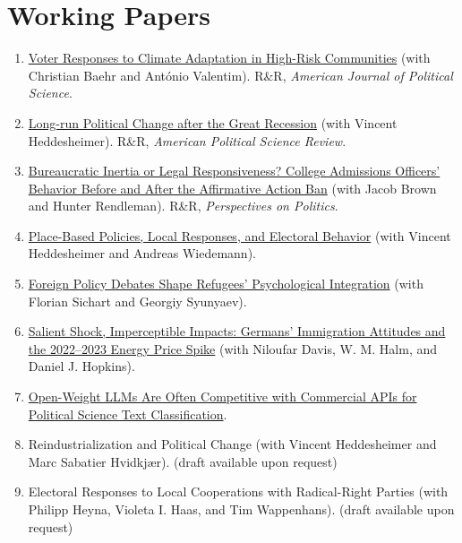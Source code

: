 \documentclass[letterpaper, 10pt]{article}
\newif\ifjobmarket
\newif\ifmerit
\begin{document}
\section*{Working Papers}
	\begin{enumerate}
			\setlength\itemsep{0.15em}
            \ifjobmarket\ifmerit\else\setlength\itemsep{0.4em}\fi\fi
            \item \href{https://osf.io/preprints/socarxiv/2g4x7}{Voter Responses to Climate Adaptation in High-Risk Communities} (with Christian Baehr and António Valentim). R\&R, \textit{American Journal of Political Science}.
			\item \href{https://osf.io/preprints/socarxiv/4zjac}{Long-run Political Change after the Great Recession} (with Vincent Heddesheimer). R\&R, \textit{American Political Science Review}.
			\item \href{https://osf.io/preprints/osf/276kz_v2}{Bureaucratic Inertia or Legal Responsiveness? College Admissions Officers' Behavior Before and After the Affirmative Action Ban} (with Jacob Brown and Hunter Rendleman). R\&R, \textit{Perspectives on Politics}.
			\item \href{https://osf.io/preprints/socarxiv/6h8cq}{Place-Based Policies, Local Responses, and Electoral Behavior} (with Vincent Heddesheimer and Andreas Wiedemann).
			\item \href{https://osf.io/preprints/osf/6s8tn_v4}{Foreign Policy Debates Shape Refugees' Psychological Integration} (with Florian Sichart and Georgiy Syunyaev).
			\item \href{https://doi.org/10.31235/osf.io/ck7aj_v2}{Salient Shock, Imperceptible Impacts: Germans' Immigration Attitudes and the 2022--2023 Energy Price Spike} (with Niloufar Davis, W. M. Halm, and Daniel J. Hopkins).
			\item \href{https://doi.org/10.48550/arXiv.2605.19275}{Open-Weight LLMs Are Often Competitive with Commercial APIs for Political Science Text Classification}.
			\item Reindustrialization and Political Change (with Vincent Heddesheimer and Marc Sabatier Hvidkj\ae r). (draft available upon request)
			\item Electoral Responses to Local Cooperations with Radical-Right Parties (with Philipp Heyna, Violeta I. Haas, and Tim Wappenhans). (draft available upon request)
			\ifjobmarket
			\item Industrial Policy and the Politics of Delivery: Evidence from WWII War Plants. (draft available upon request)
			\fi
		\end{enumerate}
\end{document}
